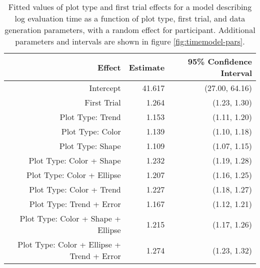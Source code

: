 \begin{table}[ht]
\centering
\begin{tabular}{rrr}
  \hline
Effect & Estimate & 95\% Confidence Interval \\ 
  \hline
Intercept & 41.617 & (27.00, 64.16) \\ 
  First Trial & 1.264 & (1.23, 1.30) \\ 
  Plot Type: Trend & 1.153 & (1.11, 1.20) \\ 
  Plot Type: Color & 1.139 & (1.10, 1.18) \\ 
  Plot Type: Shape & 1.109 & (1.07, 1.15) \\ 
  Plot Type: Color + Shape & 1.232 & (1.19, 1.28) \\ 
  Plot Type: Color + Ellipse & 1.207 & (1.16, 1.25) \\ 
  Plot Type: Color + Trend & 1.227 & (1.18, 1.27) \\ 
  Plot Type: Trend + Error & 1.167 & (1.12, 1.21) \\ 
  Plot Type: Color + Shape + Ellipse & 1.215 & (1.17, 1.26) \\ 
  Plot Type: Color + Ellipse + Trend + Error & 1.274 & (1.23, 1.32) \\ 
   \hline
\end{tabular}
\caption[Fixed effects for trial time model including data parameters.]{Fitted values of plot type and first trial effects for a model describing log evaluation time as a function of plot type, first trial, and data generation parameters, with a random effect for participant. Additional parameters and intervals are shown in figure \ref{fig:timemodel-pars}.} 
\label{tab:timemodel-pars}
\end{table}
